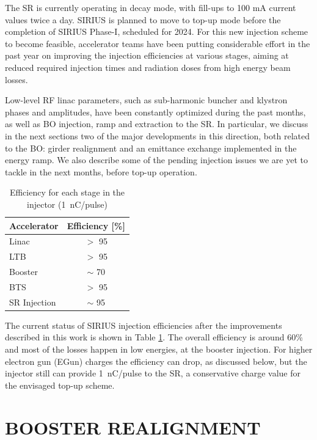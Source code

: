 \documentclass[a4paper,
               keeplastbox,   %
               ]{jacow}
\begin{document}
The SR is currently operating in decay mode, with fill-ups to 100 mA current values twice a day. SIRIUS is planned to move to top-up mode before the completion of SIRIUS Phase-I, scheduled for 2024\cite{liu:IPAC22}. For this new injection scheme to become feasible, accelerator teams have been putting considerable effort in the past year on improving the injection efficiencies at various stages, aiming at reduced required injection times and radiation doses from high energy beam losses.

Low-level RF linac parameters, such as sub-harmonic buncher and klystron phases and amplitudes, have been constantly optimized during the past months, as well as BO injection, ramp and extraction to the SR. In particular, we discuss in the next sections two of the major developments in this direction, both related to the BO: girder realignment and an emittance exchange implemented in the energy ramp. We also describe some of the pending injection issues we are yet to tackle in the next months, before top-up operation. 

\begin{table}[!hbt]
   \centering
   \caption{Efficiency for each stage in the injector (\SI{1}{\nano\coulomb}/pulse)}
   \begin{tabular}{lc}
      \toprule
      \textbf{Accelerator} & \textbf{Efficiency [\%]} \\
       \midrule
        Linac & $>$ 95 \\ %
        LTB & $>$ 95 \\
        Booster & $\sim$ 70 \\
        BTS & $>$ 95 \\
        SR Injection & $\sim$ 95 \\
       \bottomrule
   \end{tabular}
   \label{tab:inj-eff}
\end{table}

The current status of SIRIUS injection efficiencies after the improvements described in this work is shown in Table \ref{tab:inj-eff}. The overall efficiency is around 60\% and most of the losses happen in low energies, at the booster injection. For higher electron gun (EGun) charges the efficiency can drop, as discussed below, but the injector still can provide \SI{1}{\nano\coulomb}/pulse to the SR, a conservative charge value for the envisaged top-up scheme.

\section{BOOSTER REALIGNMENT}
\end{document}
